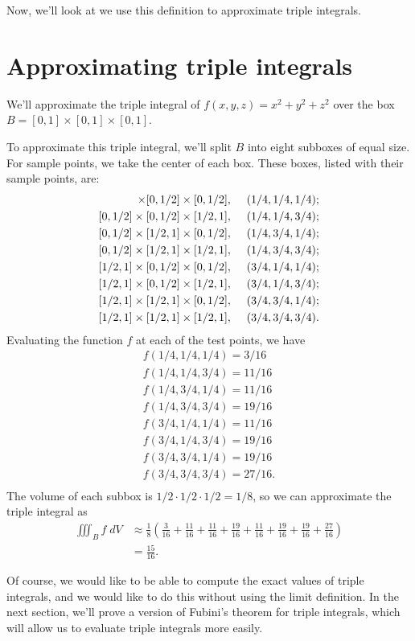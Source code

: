 \documentclass{ximera}
\begin{document}
Now, we'll look at we use this definition to approximate triple integrals.

\section*{Approximating triple integrals}

\begin{example}
We'll approximate the triple integral of $f(x,y,z) = x^2+y^2+z^2$ over the box $B = [0,1]\times [0,1]\times [0,1]$.

To approximate this triple integral, we'll split $B$ into eight subboxes of equal size. For sample points, we take the center of each box. These boxes, listed with their sample points, are:
\begin{align*}
[0,1/2]\times [0,1/2]\times [0,1/2],\hspace{.5cm}& (1/4, 1/4, 1/4);\\
[0,1/2]\times [0,1/2]\times  [1/2,1],\hspace{.5cm} & (1/4, 1/4, 3/4);\\
[0,1/2]\times [1/2,1]\times  [0,1/2],\hspace{.5cm} & (1/4, 3/4, 1/4);\\
[0,1/2]\times [1/2,1]\times  [1/2,1],\hspace{.5cm} & (1/4, 3/4, 3/4);\\
[1/2,1]\times [0,1/2]\times  [0,1/2],\hspace{.5cm} & (3/4, 1/4, 1/4);\\
[1/2,1]\times [0,1/2]\times  [1/2,1],\hspace{.5cm} & (3/4, 1/4, 3/4);\\
[1/2,1]\times [1/2,1]\times  [0,1/2],\hspace{.5cm} & (3/4, 3/4, 1/4);\\
[1/2,1]\times [1/2,1]\times  [1/2,1],\hspace{.5cm} & (3/4, 3/4, 3/4).\\
\end{align*}
Evaluating the function $f$ at each of the test points, we have
\begin{align*}
f(1/4, 1/4, 1/4) = 3/16\\
f(1/4, 1/4, 3/4) = 11/16\\
f(1/4, 3/4, 1/4) = 11/16\\
f(1/4, 3/4, 3/4) = 19/16\\
f(3/4, 1/4, 1/4) = 11/16\\
f(3/4, 1/4, 3/4) = 19/16\\
f(3/4, 3/4, 1/4) = 19/16\\
f(3/4, 3/4, 3/4) = 27/16.\\
\end{align*}
The volume of each subbox is $1/2\cdot 1/2\cdot 1/2 = 1/8$, so we can approximate the triple integral as
\begin{align*}
\iiint_B f\;dV &\approx \frac{1}{8}\left(\frac{3}{16}+\frac{11}{16}+\frac{11}{16}+\frac{19}{16}+\frac{11}{16}+\frac{19}{16}+\frac{19}{16}+\frac{27}{16}\right)\\
&= \frac{15}{16}.
\end{align*}
\end{example}

Of course, we would like to be able to compute the exact values of triple integrals, and we would like to do this without using the limit definition. In the next section, we'll prove a version of Fubini's theorem for triple integrals, which will allow us to evaluate triple integrals more easily.
\end{document}
